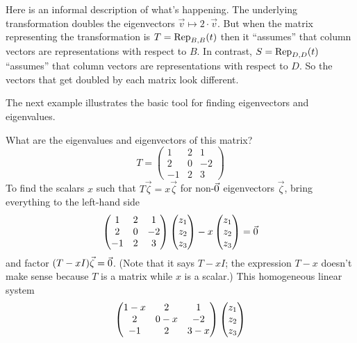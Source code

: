 \begin{remark}
Here is an informal description of what's happening.  
The underlying transformation doubles the 
eigenvectors $\vec{v}\mapsto 2\cdot\vec{v}$.
But when the matrix representing the transformation is
\( T=\rep{t}{B,B} \) then it ``assumes'' that column vectors are 
representations with respect to \( B \).
In contrast, \( S=\rep{t}{D,D} \) ``assumes'' that column vectors 
are representations with respect to \( D \).
So the vectors that get doubled by each matrix look different.
\end{remark}

The next example illustrates the basic tool for
finding eigenvectors and eigenvalues.

\begin{example}  \label{ex:IntroCharEqn}
What are the eigenvalues and eigenvectors of this matrix?
\begin{equation*}
  T=
  \begin{pmatrix}
     1    &2    &1    \\
     2    &0    &-2   \\
    -1    &2    &3
  \end{pmatrix}
\end{equation*}
To find the scalars \( x \) such that
\( T\vec{\zeta}=x\vec{\zeta} \) for non-\( \zero \) eigenvectors
\( \vec{\zeta} \), bring everything to the left-hand side
\begin{equation*}
  \begin{pmatrix}
     1    &2    &1    \\
     2    &0    &-2   \\
    -1    &2    &3
  \end{pmatrix}
  \colvec{z_1 \\ z_2 \\ z_3}
  -x\colvec{z_1 \\ z_2 \\ z_3}
  =\zero
\end{equation*}
and factor
\( (T-x I)\vec{\zeta}=\zero \).
(Note that it says $T-xI$; the expression \( T-x \) doesn't make sense 
because \( T \) is a matrix while \( x \) is a scalar.)
This homogeneous linear system
\begin{equation*}
  \begin{pmatrix}
   1-x           &2            &1            \\
     2           &0-x          &-2           \\
    -1           &2            &3-x
  \end{pmatrix}
  \colvec{z_1 \\ z_2 \\ z_3}

\end{equation*}
\end{example}
